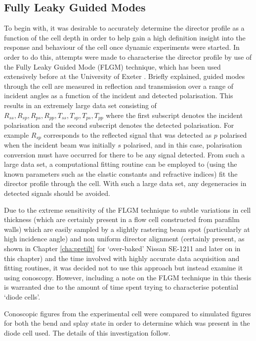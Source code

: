 \subsection{Fully Leaky Guided Modes}
To begin with, it was desirable to accurately determine the director profile as a function of the cell depth in order to help gain a high definition insight into the response and behaviour of the cell once dynamic experiments were started. In order to do this, attempts were made to characterise the director profile by use of the Fully Leaky Guided Mode (FLGM) technique, which has been used extensively before at the University of Exeter \cite{Cornford2009,Yang2007,Jewell2005a,Jewell2006,Jewell2007}. Briefly explained, guided modes through the cell are measured in reflection and transmission over a range of incident angles as a function of the incident and detected polarisation. This results in an extremely large data set consisting of $R_{ss},R_{sp},R_{ps},R_{pp},T_{ss},T_{sp},T_{ps},T_{pp}$ where the first subscript denotes the incident polarisation and the second subscript denotes the detected polarisation. For example $R_{sp}$ corresponds to the reflected signal that was detected as $p$ polarised when the incident beam was initially $s$ polarised, and in this case, polarisation conversion must have occurred for there to be any signal detected. From such a large data set, a computational fitting routine can be employed to (using the known parameters such as the elastic constants and refractive indices) fit the director profile through the cell. With such a large data set, any degeneracies in detected signals should be avoided. 

Due to the extreme sensitivity of the FLGM technique to subtle variations in cell thickness \cite{Taphouse2007} (which are certainly present in a flow cell constructed from parafilm walls) which are easily sampled by a slightly rastering beam spot (particularly at high incidence angle) and non uniform director alignment (certainly present, as shown in Chapter \ref{cha:pretilt} for `over-baked' Nissan SE-1211 and later on in this chapter) and the time involved with highly accurate data acquisition and fitting routines, it was decided not to use this approach but instead examine it using conoscopy. However, including a note on the FLGM technique in this thesis is warranted due to the amount of time spent trying to characterise potential `diode cells'.

Conoscopic figures from the experimental cell were compared to simulated figures for both the bend and splay state in order to determine which was present in the diode cell used. The details of this investigation follow.

